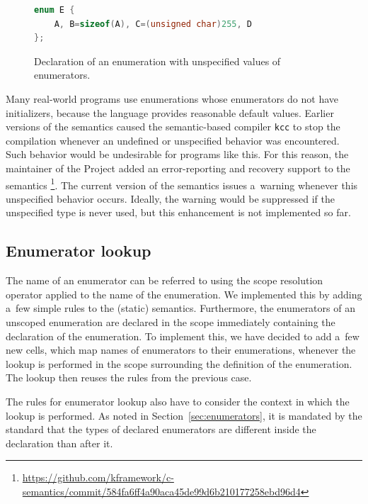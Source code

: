 \documentclass[nolot,nolof,nocover,printed]{fithesis3}
\newcommand{\kcc}{\texttt{kcc}\xspace}
\begin{document}
\begin{figure}[t]
\begin{lstlisting}[language=C++]
enum E {
	A, B=sizeof(A), C=(unsigned char)255, D
};
\end{lstlisting}
\caption{Declaration of an enumeration with unspecified values of enumerators.}
\label{fig:ugly-enum}
\end{figure}

Many real-world programs use enumerations whose enumerators do not have initializers, because the language provides reasonable default values. Earlier versions of the semantics caused the semantic-based compiler \kcc to stop the compilation whenever an undefined or unspecified behavior was encountered. Such behavior would be undesirable for programs like this. For this reason, the maintainer of the Project added an error-reporting and recovery support to the semantics \footnote{\url{https://github.com/kframework/c-semantics/commit/584fa6ff4a90aca45de99d6b210177258ebd96d4}}. The current version of the semantics issues a~warning whenever this unspecified behavior occurs. Ideally, the warning would be suppressed if the unspecified type is never used, but this enhancement is not implemented so far.


\subsection{Enumerator lookup}

The name of an enumerator can be referred to using the scope resolution operator applied to the name of the enumeration. We implemented this by adding a~few simple rules to the (static) semantics.
Furthermore, the enumerators of an unscoped enumeration are declared in the scope immediately containing the declaration of the enumeration. To implement this, we have decided to add a~few new cells, which map names of enumerators to their enumerations, whenever the lookup is performed in the scope surrounding the definition of the enumeration. The lookup then reuses the rules from the previous case.

The rules for enumerator lookup also have to consider the context in which the lookup is performed. As noted in Section~\ref{sec:enumerators}, it is mandated by the standard that the types of declared enumerators are different inside the declaration than after it.
\end{document}
